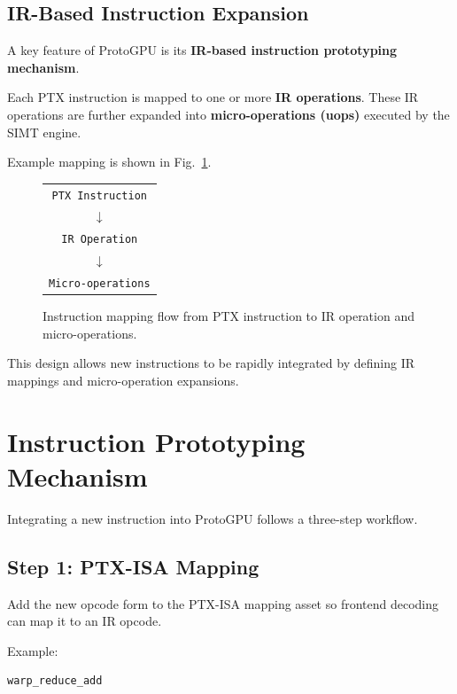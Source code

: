 \documentclass[11pt]{article}
\begin{document}
\hypertarget{ir-based-instruction-expansion}{%
\subsection{IR-Based Instruction
Expansion}\label{ir-based-instruction-expansion}}

A key feature of ProtoGPU is its \textbf{IR-based instruction
prototyping mechanism}.

Each PTX instruction is mapped to one or more \textbf{IR operations}.
These IR operations are further expanded into \textbf{micro-operations
(uops)} executed by the SIMT engine.

Example mapping is shown in Fig.~\ref{fig:ir-uop-mapping}.

\begin{figure}[H]
\centering
\begin{tabular}{c}
\texttt{PTX Instruction} \\
$\downarrow$ \\
\texttt{IR Operation} \\
$\downarrow$ \\
\texttt{Micro-operations}
\end{tabular}
\caption{Instruction mapping flow from PTX instruction to IR operation and micro-operations.}
\label{fig:ir-uop-mapping}
\end{figure}

This design allows new instructions to be rapidly integrated by defining
IR mappings and micro-operation expansions.


\hypertarget{instruction-prototyping-mechanism}{%
\section{Instruction Prototyping
Mechanism}\label{instruction-prototyping-mechanism}}

Integrating a new instruction into ProtoGPU follows a three-step workflow.

\hypertarget{step-1-define-ptx-isa-mapping}{%
\subsection{Step 1: PTX-ISA
Mapping}\label{step-1-define-ptx-isa-mapping}}

Add the new opcode form to the PTX-ISA mapping asset so frontend
decoding can map it to an IR opcode.

Example:

\begin{lstlisting}
warp_reduce_add
\end{lstlisting}
\end{document}
